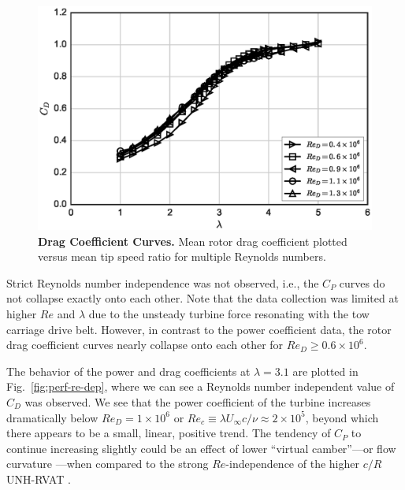 \documentclass[10pt,letterpaper]{article}
\begin{document}
\begin{figure}[h]
    \includegraphics[width=\textwidth]{figures/cd_curves.eps}

    \caption{{\bf Drag Coefficient Curves.} Mean rotor drag coefficient plotted
    versus mean tip speed ratio for multiple Reynolds numbers.}

    \label{fig:cd-curves}
\end{figure}

Strict Reynolds number independence was not observed, i.e., the $C_P$ curves do
not collapse exactly onto each other. Note that the data collection was limited
at higher $Re$ and $\lambda$ due to the unsteady turbine force resonating with
the tow carriage drive belt. However, in contrast to the power coefficient data,
the rotor drag coefficient curves nearly collapse onto each other for $Re_D \ge
0.6 \times 10^6$.

The behavior of the power and drag coefficients at $\lambda=3.1$ are plotted in
Fig.~\ref{fig:perf-re-dep}, where we can see a Reynolds number independent value
of $C_D$ was observed. We see that the power coefficient of the turbine
increases dramatically below $Re_D = 1 \times 10^6$ or $Re_c \equiv \lambda
U_\infty c / \nu \approx 2 \times 10^5$, beyond which there appears to be a
small, linear, positive trend. The tendency of $C_P$ to continue increasing
slightly could be an effect of lower ``virtual camber''---or flow curvature
\cite{Migliore1980}---when compared to the strong $Re$-independence of the
higher $c/R$ UNH-RVAT \cite{Bachant2015-RVAT-Re-dep}.
\end{document}
